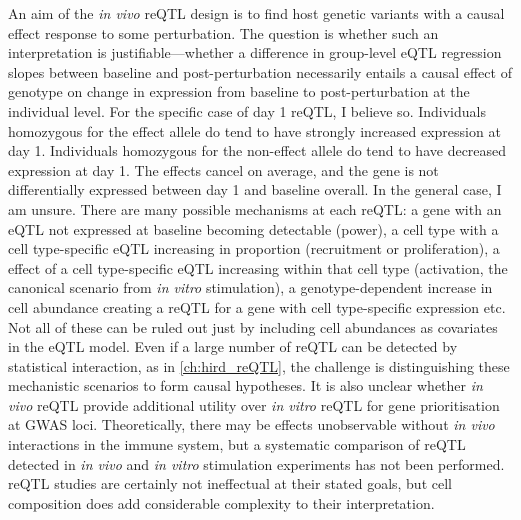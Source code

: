 An aim of the \textit{in vivo} \gls{reQTL} design is to find host genetic variants with a causal effect response to some perturbation.
The question is whether such an interpretation is justifiable---whether a difference in group-level \gls{eQTL} regression slopes between baseline and post-perturbation
necessarily entails a causal effect of genotype on change in expression from baseline to post-perturbation at the individual level.
For the specific case of  day 1 \gls{reQTL}, I believe so.
Individuals homozygous for the effect allele do tend to have strongly increased expression at day 1.
Individuals homozygous for the non-effect allele do tend to have decreased expression at day 1.
The effects cancel on average, and the gene is not differentially expressed between day 1 and baseline overall.
In the general case, I am unsure.
There are many possible mechanisms at each \gls{reQTL}:
a gene with an \gls{eQTL} not expressed at baseline becoming detectable (power),
a cell type with a cell type-specific \gls{eQTL} increasing in proportion (recruitment or proliferation),
a effect of a cell type-specific \gls{eQTL} increasing within that cell type (activation, the canonical scenario from \textit{in vitro} stimulation),
a genotype-dependent increase in cell abundance creating a \gls{reQTL} for a gene with cell type-specific expression
etc.
Not all of these can be ruled out just by including cell abundances as covariates in the \gls{eQTL} model.
Even if a large number of \gls{reQTL} can be detected by statistical interaction, as in \cref{ch:hird_reQTL},
the challenge is distinguishing these mechanistic scenarios to form causal hypotheses.
It is also unclear whether \textit{in vivo} \gls{reQTL} provide additional utility over \textit{in vitro} \gls{reQTL} for gene prioritisation at \gls{GWAS} loci.
Theoretically, there may be effects unobservable without \textit{in vivo} interactions in the immune system, 
but a systematic comparison of \gls{reQTL} detected in \textit{in vivo} and \textit{in vitro} stimulation experiments has not been performed.
 \gls{reQTL} studies are certainly not ineffectual at their stated goals, 
but cell composition does add considerable complexity to their interpretation.

